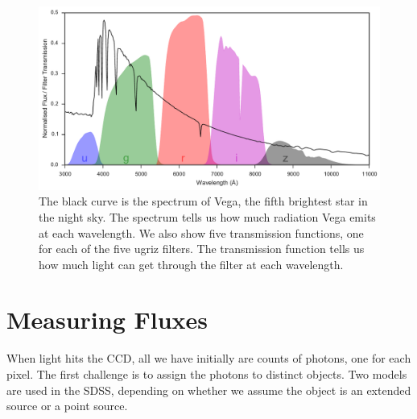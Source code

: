 \begin{figure}[tbp]
	\centering \includegraphics[width=\textwidth]{figures/2_astro/vega_filters_and_spectrum}
	\caption[Spectrum of the star Vega and the ugriz bandpasses]{The black curve is the
		spectrum of Vega, the fifth brightest star in the night sky. The spectrum tells us how
		much radiation Vega emits at each wavelength. We also show five transmission functions,
		one for each of the five ugriz filters. The transmission function tells us how much light
		can get through the filter at each wavelength.} \label{fig:vega} 
\end{figure}


\section{Measuring Fluxes} 
\label{sec:mag}
When light hits the CCD, all we have initially are counts of photons, one for each pixel.
The first challenge is to assign the photons to distinct objects. Two models are used
in the SDSS, depending on whether we assume the object is an extended source or a point source.


